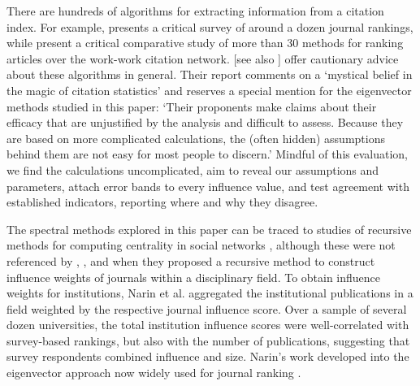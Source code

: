 There are hundreds of algorithms for extracting information from a citation index. For example, \textcite{pendleburyUseMisuseJournal2009} presents a critical survey of around a dozen journal rankings, while \textcite{kanellosImpactbasedRankingScientific2019} present a critical comparative study of more than 30 methods for ranking articles over the work-work citation network. \textcite{adlerCitationStatisticsReport2009} [see also \textcite{lehmannCommentCitationStatistics2009}] offer cautionary advice about these algorithms in general. Their report comments on a `mystical belief in the magic of citation statistics' and reserves a special mention for the eigenvector methods studied in this paper: `Their proponents make claims about their efficacy that are unjustified by the analysis and difficult to assess. Because they are based on more complicated calculations, the (often hidden) assumptions behind them are not easy for most people to discern.' Mindful of this evaluation, we find the calculations uncomplicated, aim to reveal our assumptions and parameters, attach error bands to every influence value, and test agreement with established indicators, reporting where and why they disagree.

The spectral methods explored in this paper can be traced to studies of recursive methods for computing centrality in social networks \citep{vignaSpectralRanking2016}, although these were 
not referenced by \textcite{narinEvaluativeBibliometricsUse1976}, \textcite{pinskiCitationInfluenceJournal1976}, and \textcite{narinStructureBiomedicalLiterature1976} when they proposed a recursive method to construct influence weights of journals within a disciplinary field. To obtain influence weights for institutions, Narin et al. aggregated the institutional publications in a field weighted by the respective journal influence score. Over a sample of several dozen universities, the total institution influence scores were well-correlated with survey-based rankings, but also with the number of publications, suggesting that survey respondents combined influence and size. Narin's work developed into the eigenvector approach now widely used for journal ranking \citep{bollenJournalStatus2006, bergstromEigenfactorMetrics2008, franceschetTenGoodReasons2010, vignaSpectralRanking2016}. 

